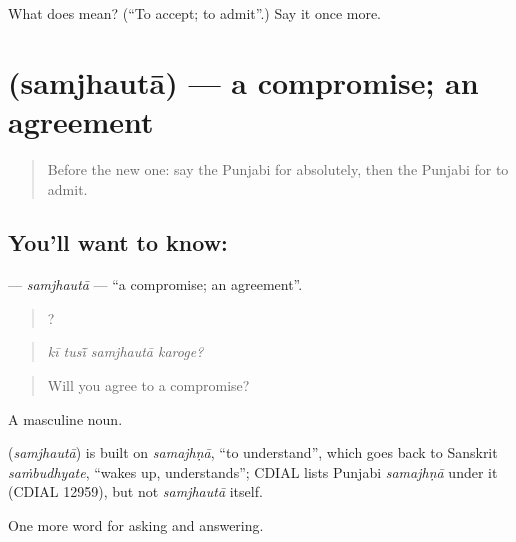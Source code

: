 \begin{tcolorbox}[breakable,colback=teal!4,colframe=teal!35!black,title={Before you move on}]
What does  mean? (\textquotedblleft{}To accept; to admit\textquotedblright{}.) Say it once more.
\end{tcolorbox}
\section[\texorpdfstring{\pa{ਸਮਝੌਤਾ} (samjhautā)}{ਸਮਝੌਤਾ (samjhautā)}]{ (samjhautā) — a compromise; an agreement}

\label{lesson:PA-C340-samjhauta}



\begin{quote}
Before the new one: say the Punjabi for absolutely, then the Punjabi for to admit.
\end{quote}

\subsection*{You'll want to know: }
\textbf{} — \emph{samjhautā} — \textquotedblleft{}a compromise; an agreement\textquotedblright{}.

\begin{quote}
   ?
\end{quote}

\begin{quote}
\emph{kī tusī̃ samjhautā karoge?}
\end{quote}

\begin{quote}
Will you agree to a compromise?
\end{quote}

A masculine noun.

\begin{cousinweb}
\textbf{} (\emph{samjhautā}) is built on \emph{samajhṇā}, \textquotedblleft{}to understand\textquotedblright{}, which goes back to Sanskrit \emph{saṁbudhyate}, \textquotedblleft{}wakes up, understands\textquotedblright{}; CDIAL lists Punjabi \emph{samajhṇā} under it (CDIAL 12959), but not \emph{samjhautā} itself.
\end{cousinweb}

\begin{grammarlens}[title={What you've built}]
One more word for asking and answering.
\end{grammarlens}

